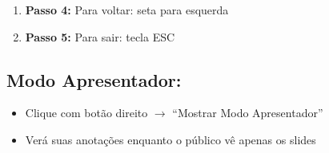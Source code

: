 \documentclass[11pt]{article}
\begin{document}
\begin{multicols}{2}
\begin{enumerate}
\item \textbf{Passo 4:} Para voltar: seta para esquerda

\item \textbf{Passo 5:} Para sair: tecla ESC
\end{enumerate}

\subsection*{Modo Apresentador:}
\begin{itemize}
\item Clique com botão direito $\rightarrow$ ``Mostrar Modo Apresentador''
\item Verá suas anotações enquanto o público vê apenas os slides
\end{itemize}

\end{multicols}
\end{document}
